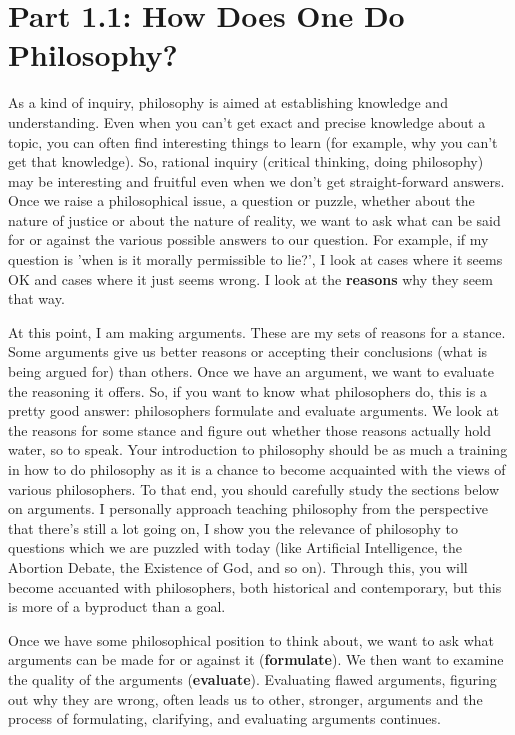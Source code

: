 \section{Part 1.1: How Does One Do Philosophy?}
\label{s:p1.1}
As a kind of inquiry, philosophy is aimed at establishing knowledge and understanding. Even when you can't get exact and precise knowledge about a topic, you can often find interesting things to learn (for example, why you can't get that knowledge). So, rational inquiry (critical thinking, doing philosophy) may be interesting and fruitful even when we don't get straight-forward answers. Once we raise a philosophical issue, a question or puzzle, whether about the nature of justice or about the nature of reality, we want to ask what can be said for or against the various possible answers to our question. For example, if my question is 'when is it morally permissible to lie?', I look at cases where it seems OK and cases where it just seems wrong. I look at the \textbf{reasons} why they seem that way.

At this point, I am making \glspl{argument}. These are my sets of reasons for a stance. Some arguments give us better reasons or accepting their \glspl{conclusion} (what is being argued for) than others. Once we have an argument, we want to evaluate the reasoning it offers. So, if you want to know what philosophers do, this is a pretty good answer: philosophers formulate and evaluate arguments. We look at the reasons for some stance and figure out whether those reasons actually hold water, so to speak.  Your introduction to philosophy should be as much a training in how to do philosophy as it is a chance to become acquainted with the views of various philosophers. To that end, you should carefully study the sections below on arguments. I personally approach teaching philosophy from the perspective that there's still a lot going on, I show you the relevance of philosophy to questions which we are puzzled with today (like Artificial Intelligence, the Abortion Debate, the Existence of God, and so on). Through this, you will become accuanted with philosophers, both historical and contemporary, but this is more of a byproduct than a goal.

Once we have some philosophical position to think about, we want to ask what arguments can be made for or against it (\textbf{formulate}). We then want to examine the quality of the arguments (\textbf{evaluate}). Evaluating flawed arguments, figuring out why they are wrong, often leads us to other, stronger, arguments and the process of formulating, clarifying, and evaluating arguments continues.

